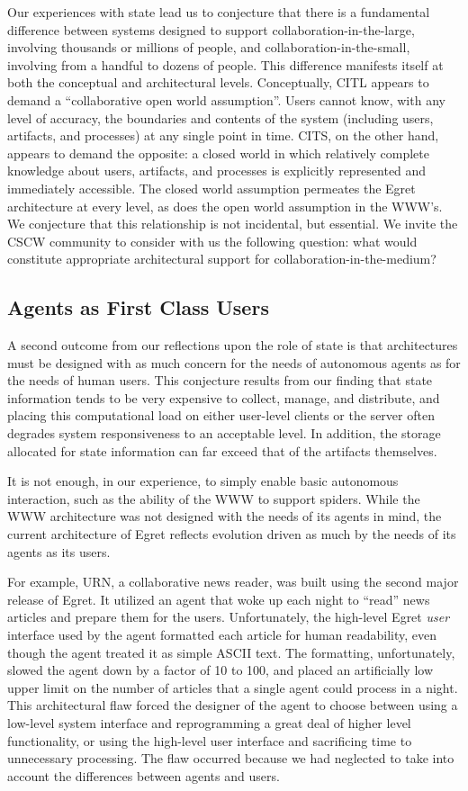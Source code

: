 Our experiences with state lead us to conjecture that there is a
fundamental difference between systems designed to support
collaboration-in-the-large, involving thousands or millions of people, and
collaboration-in-the-small, involving from a handful to dozens of people.
This difference manifests itself at both the conceptual and architectural
levels. Conceptually, CITL appears to demand a ``collaborative open world
assumption''. Users cannot know, with any level of accuracy, the boundaries
and contents of the system (including users, artifacts, and processes) at
any single point in time. CITS, on the other hand, appears to demand the
opposite: a closed world in which relatively complete knowledge about
users, artifacts, and processes is explicitly represented and immediately
accessible.  The closed world assumption permeates the Egret architecture
at every level, as does the open world assumption in the WWW's. We
conjecture that this relationship is not incidental, but essential. We
invite the CSCW community to consider with us the following question: what
would constitute appropriate architectural support for
collaboration-in-the-medium?

\subsection{Agents as First Class Users}

A second outcome from our reflections upon the role of state is that
architectures must be designed with as much concern for the needs of
autonomous agents as for the needs of human users.  This conjecture results
from our finding that state information tends to be very expensive to
collect, manage, and distribute, and placing this computational load on
either user-level clients or the server often degrades system
responsiveness to an acceptable level.  In addition, the storage allocated
for state information can far exceed that of the artifacts themselves.

It is not enough, in our experience, to simply enable basic autonomous
interaction, such as the ability of the WWW to support spiders.  While
the WWW architecture was not designed with the needs of its agents in mind,
the current architecture of Egret reflects evolution driven as much by the
needs of its agents as its users.

For example, URN, a collaborative news reader, was built using the second
major release of Egret. It utilized an agent that woke up each night to
``read'' news articles and prepare them for the users. Unfortunately, the
high-level Egret {\em user} interface used by the agent formatted each
article for human readability, even though the agent treated it as simple
ASCII text. The formatting, unfortunately, slowed the agent down by a
factor of 10 to 100, and placed an artificially low upper limit on the
number of articles that a single agent could process in a night.  This
architectural flaw forced the designer of the agent to choose between using
a low-level system interface and reprogramming a great deal of higher level
functionality, or using the high-level user interface and sacrificing time
to unnecessary processing. The flaw occurred because we had neglected to
take into account the differences between agents and users. 

